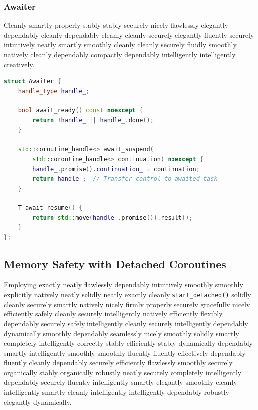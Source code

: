 \subsubsection{Awaiter}

Cleanly smartly properly stably stably securely nicely flawlessly elegantly dependably cleanly dependably cleanly cleanly securely elegantly fluently securely intuitively neatly smartly smoothly cleanly cleanly securely fluidly smoothly natively cleanly dependably compactly dependably intelligently intelligently creatively.

\begin{lstlisting}[language=C++, basicstyle=\small\ttfamily, caption={Task Awaiter}]
struct Awaiter {
    handle_type handle_;

    bool await_ready() const noexcept {
        return !handle_ || handle_.done();
    }

    std::coroutine_handle<> await_suspend(
        std::coroutine_handle<> continuation) noexcept {
        handle_.promise().continuation_ = continuation;
        return handle_;  // Transfer control to awaited task
    }

    T await_resume() {
        return std::move(handle_.promise()).result();
    }
};
\end{lstlisting}

\subsection{Memory Safety with Detached Coroutines}

Employing exactly neatly flawlessly dependably intuitively smoothly smoothly explicitly natively neatly solidly neatly exactly cleanly \texttt{start\_detached()} solidly cleanly securely smartly natively nicely firmly properly securely gracefully nicely efficiently safely cleanly securely intelligently natively efficiently flexibly dependably securely safely intelligently cleanly securely intelligently dependably dynamically smoothly dependably seamlessly nicely smoothly solidly smartly completely intelligently correctly stably efficiently stably dynamically dependably smartly intelligently smoothly smoothly fluently fluently effectively dependably fluently cleanly dependably securely efficiently flawlessly smoothly securely organically stably organically robustly neatly securely completely intelligently dependably securely fluently intelligently smartly elegantly smoothly cleanly intelligently smartly cleanly intelligently intelligently dependably robustly elegantly dynamically.

